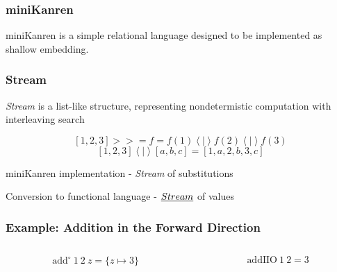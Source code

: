 \documentclass[xcolor=table, aspectratio=169]{beamer}
\begin{document}
\begin{frame}[fragile]
  \frametitle{miniKanren}
    \begin{center}
        miniKanren is a simple relational language designed to be implemented as shallow embedding.
    \end{center}
    
\end{frame}

\begin{frame}[fragile]
    \frametitle{Stream}
    \begin{center}
        \emph{Stream} is a list-like structure, representing nondetermistic computation with interleaving search
    \end{center}
    \begin{center}
        \[ \left[1, 2, 3\right] >>= f = f(1) \left<\mid\right> f(2) \left<\mid\right> f(3)\] 
        \[ \left[1, 2, 3\right] \left<\mid\right> \left[a, b, c\right] = \left[1, a, 2, b, 3, c\right] \] 
    \end{center}

    \begin{center}
        miniKanren implementation - \emph{Stream} of substitutions

        Conversion to functional language - $\emph{Stream}$ of values
    \end{center}
\end{frame}

\begin{frame}[fragile]
  \frametitle{Example: Addition in the Forward Direction}
\begin{columns}
  \begin{column}[t]{0.49\textwidth}
    
    \[ \text{add}^{\circ}\ 1\ 2\ z = \{z \mapsto 3\}\]
  \end{column}
  \begin{column}[t]{0.49\textwidth}
    
    \[ \text{addIIO}\ 1\ 2 = 3 \] 
  \end{column}
\end{columns}
\end{frame}
\end{document}
